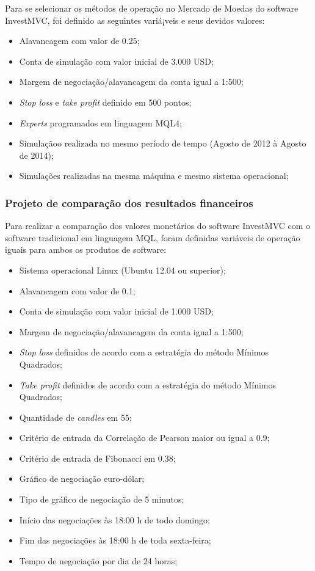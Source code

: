 Para se selecionar os métodos de operação no Mercado de Moedas do software InvestMVC, foi definido as seguintes variá¡veis e seus devidos valores:

\begin{itemize}
\item Alavancagem com valor de 0.25;
\item Conta de simulação com valor inicial de 3.000 USD;
\item Margem de negociação/alavancagem da conta igual a 1:500;
\item \textit{Stop loss} e \textit{take profit} definido em 500 pontos;
\item\textit{Experts} programados em linguagem MQL4;
\item Simulaçãoo realizada no mesmo período de tempo (Agosto de 2012 à Agosto de 2014);
\item Simulações realizadas na mesma máquina e mesmo sistema operacional;
\end{itemize}

\subsubsection{Projeto de comparação dos resultados financeiros}

Para realizar a comparação dos valores monetários do software InvestMVC com o software tradicional em linguagem MQL, foram definidas variáveis de operação iguais para ambos os produtos de software:

\begin{itemize}
\item Sistema operacional Linux (Ubuntu 12.04 ou superior);
\item Alavancagem com valor de 0.1;
\item Conta de simulação com valor inicial de 1.000 USD;
\item Margem de negociação/alavancagem da conta igual a 1:500;
\item \textit{Stop loss} definidos de acordo com a estratégia do método Mínimos Quadrados;
\item \textit{Take profit} definidos de acordo com a estratégia do método Mínimos Quadrados;
\item Quantidade de \textit{candles} em 55;
\item Critério de entrada da Correlação de Pearson maior ou igual a 0.9;
\item Critério de entrada de Fibonacci em 0.38;
\item Gráfico de negociação euro-dólar;
\item Tipo de gráfico de negociação de 5 minutos;
\item Início das negociações às 18:00 h de todo domingo;
\item Fim das negociações às 18:00 h de toda sexta-feira;
\item Tempo de negociação por dia de 24 horas;
\end{itemize}

